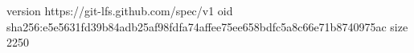 version https://git-lfs.github.com/spec/v1
oid sha256:e5e5631fd39b84adb25af98fdfa74affee75ee658bdfc5a8c66e71b8740975ac
size 2250
